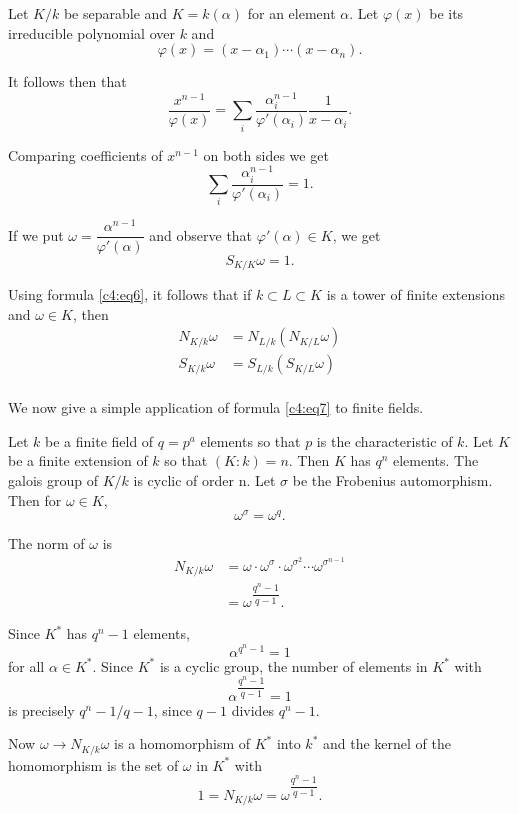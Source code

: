 Let $ K/k $ be separable and $ K= k (\alpha) $ for an element
$\alpha $. Let $ \varphi (x) $ be its irreducible polynomial over $k$
and  
$$
\varphi (x) = ( x - \alpha_1 ) \cdots ( x - \alpha_n ).
$$

It follows then that 
$$
\frac{x^{n-1}}{\varphi (x)} = \sum_{i}
\frac{\alpha^{n-1}_{i}}{\varphi' (\alpha_i)}   \frac{1}{x
  -\alpha_i} . 
$$

Comparing coefficients of $ x^{n-1} $ on both sides we get  
$$
\sum_{i} \frac{\alpha^{n-1}_{i}}{\varphi' (\alpha_i)} = 1 .
$$

If we put $ \omega = \dfrac{\alpha^{n-1}}{\varphi' (\alpha)} $ and
observe that $ \varphi' (\alpha) \in K $, we get  
$$
S_{K/K} \omega = 1 .
$$

Using formula \eqref{c4:eq6}, it follows that if $ k\subset L\subset K $ is a
tower of finite extensions and $ \omega \in K $, then 
\begin{align*}
N_{K/k} \omega &= N_{L/k}( N_{K/L}\omega ) \\
S_{K/k} \omega &= S_{L/k} ( S_{K/L} \omega ) \\
\end{align*}

We now give a simple application of formula \eqref{c4:eq7} to finite fields.

Let $k$ be a finite field of $ q = p^a $ elements so that $p$ is the
characteristic of $k$. Let $K$ be a finite extension of  $k$ so that $
(K:k) = n $. Then $K$ has $q^n$  elements. The galois group of $ K/ k$
is cyclic of order n. Let $\sigma$ be  the Frobenius
automorphism. Then for $ \omega \in K $, 
$$
\omega^\sigma = \omega^q .
$$\pageoriginale

The norm of $ \omega $  is 
\begin{align*}
N_{K/k} \omega &=  \omega \cdot \omega^\sigma \cdot \omega^{\sigma^{2}} \cdots
\omega^{\sigma^{n-1}} \\ 
&= \omega^{\dfrac{q^n-1}{q-1}}.
\end{align*}

Since $K^*$  has $ q^n -1 $ elements,
$$
\alpha^{q^{n}-1} = 1
$$
for all $ \alpha \in K^* $. Since $ K^* $  is a cyclic group, the
number of elements in $ K^* $ with 
$$
\alpha^{\dfrac{q^n-1}{q-1}} = 1
$$
is precisely $ q^n -1 /q-1 $, since $q - 1$ divides $ q^n-1 $. 

Now $ \omega \rightarrow N_{K/k} \omega $ is a homomorphism of $ K^* $
into  $k^* $ and the kernel of the homomorphism is the set of $ \omega $
in  $ K^* $ with 
$$
1= N_{K/k} \omega = \omega^{\dfrac{q^n-1}{q-1}}  . 
$$

